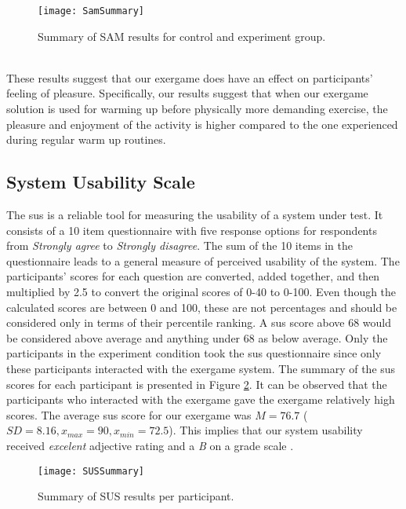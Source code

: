 \begin{figure}[h]
    \centering
    \texttt{[image: SamSummary]}
    \caption{Summary of SAM results for control and experiment group.}
    \label{fig:sam}
\end{figure}\\
These results suggest that our exergame does have an effect on participants' feeling of pleasure. Specifically, our results suggest that when our exergame solution is used for warming up before physically more demanding exercise, the pleasure and enjoyment of the activity is higher compared to the one experienced during regular warm up routines.
\subsection{System Usability Scale}
The \acrfull{sus} is a reliable tool for measuring the usability of a system under test. It consists of a 10 item questionnaire with five response options for respondents from \textit{Strongly agree} to \textit{Strongly disagree}. The sum of the 10 items in the questionnaire leads to a general measure of perceived usability of the system. The participants' scores for each question are converted, added together, and then multiplied by 2.5 to convert the original scores of 0-40 to 0-100. Even though the calculated scores are between  0 and 100, these are not percentages and should be considered only in terms of their percentile ranking. A \acrshort{sus} score above 68 would be considered above average and anything under 68 as below average. Only the participants in the experiment condition took the \acrshort{sus} questionnaire since only these participants interacted with the exergame system. The summary of the \acrshort{sus} scores for each participant is presented in Figure \ref{fig:sus}. It can be observed that the participants who interacted with the exergame gave the exergame relatively high scores. The  average \acrshort{sus} score for our exergame  was \begin{math}M = 76.7 \end{math} (\begin{math} SD = 8.16, x_{max}= 90, x_{min}= 72.5\end{math}). This implies that our system usability received \textit{excelent} adjective rating and a \textit{B} on a grade scale \cite{brooke2013sus}.
\begin{figure}[h]
    \centering
    \texttt{[image: SUSSummary]}
    \caption{Summary of SUS results per participant.}
    \label{fig:sus}
\end{figure}\\\\
